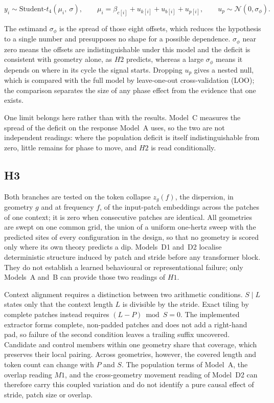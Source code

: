 \begin{equation}
\label{eq:d2phase}
y_i \sim \text{Student-}t_4(\mu_i,\ \sigma),
\qquad
\mu_i = \beta_{c[i]} + u_{k[i]} + u_{b[i]} + u_{p[i]},
\qquad
u_p \sim \mathcal{N}(0, \sigma_\phi).
\end{equation}

The estimand $\sigma_\phi$ is the spread of those eight offsets, which reduces the hypothesis to a single number and presupposes no shape for a possible dependence. $\sigma_\phi$ near zero means the offsets are indistinguishable under this model and the deficit is consistent with geometry alone, as $H2$ predicts, whereas a large $\sigma_\phi$ means it depends on where in its cycle the signal starts. Dropping $u_p$ gives a nested null, which is compared with the full model by leave-one-out cross-validation (LOO); the comparison separates the size of any phase effect from the evidence that one exists.

One limit belongs here rather than with the results. Model~C measures the spread of the deficit on the response Model~A uses, so the two are not independent readings: where the population deficit is itself indistinguishable from zero, little remains for phase to move, and $H2$ is read conditionally.

\subsection{H3}

Both branches are tested on the token collapse $z_g(f)$, the dispersion, in geometry $g$ and at frequency $f$, of the input-patch embeddings across the patches of one context; it is zero when consecutive patches are identical. All geometries are swept on one common grid, the union of a uniform one-hertz sweep with the predicted sites of every configuration in the design, so that no geometry is scored only where its own theory predicts a dip. Models~D1 and~D2 localise deterministic structure induced by patch and stride before any transformer block. They do not establish a learned behavioural or representational failure; only Models~A and~B can provide those two readings of $H1$.

Context alignment requires a distinction between two arithmetic conditions. $S\mid L$ states only that the context length $L$ is divisible by the stride. Exact tiling by complete patches instead requires $(L-P)\bmod S=0$. The implemented extractor forms complete, non-padded patches and does not add a right-hand pad, so failure of the second condition leaves a trailing suffix uncovered. Candidate and control members within one geometry share that coverage, which preserves their local pairing. Across geometries, however, the covered length and token count can change with $P$ and $S$. The population terms of Model~A, the overlap reading $M1$, and the cross-geometry movement reading of Model~D2 can therefore carry this coupled variation and do not identify a pure causal effect of stride, patch size or overlap.

